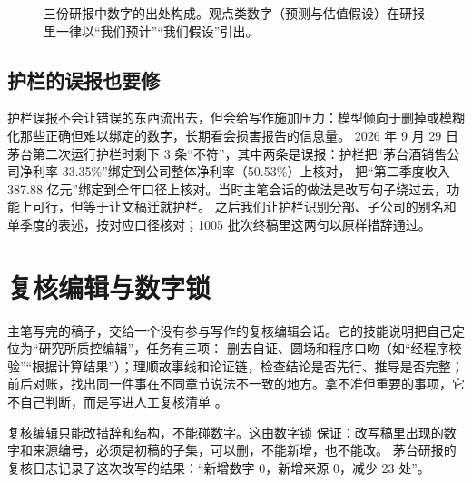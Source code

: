 \begin{figure}[htbp]
\centering
{}
\caption{三份研报中数字的出处构成。观点类数字（预测与估值假设）在研报里一律以“我们预计”“我们假设”引出。}
\label{fig:wr-prov}
\end{figure}

\subsection{护栏的误报也要修}

护栏误报不会让错误的东西流出去，但会给写作施加压力：模型倾向于删掉或模糊化那些正确但难以绑定的数字，长期看会损害报告的信息量。
2026 年 9 月 29 日茅台第二次运行护栏时剩下 3 条“不符”，其中两条是误报：护栏把“茅台酒销售公司净利率 33.35\%”绑定到公司整体净利率（50.53\%）上核对，
把“第二季度收入 387.88 亿元”绑定到全年口径上核对。当时主笔会话的做法是改写句子绕过去，功能上可行，但等于让文稿迁就护栏。
之后我们让护栏识别分部、子公司的别名和单季度的表述，按对应口径核对；1005 批次终稿里这两句以原样措辞通过。

\section{复核编辑与数字锁}

主笔写完的稿子，交给一个没有参与写作的复核编辑会话。它的技能说明把自己定位为“研究所质控编辑”，任务有三项：
删去自证、圆场和程序口吻（如“经程序校验”“根据计算结果”）；理顺故事线和论证链，检查结论是否先行、推导是否完整；
前后对账，找出同一件事在不同章节说法不一致的地方。拿不准但重要的事项，它不自己判断，而是写进人工复核清单 。

复核编辑只能改措辞和结构，不能碰数字。这由数字锁  保证：改写稿里出现的数字和来源编号，必须是初稿的子集，可以删，不能新增，也不能改。
茅台研报的复核日志记录了这次改写的结果：“新增数字 0，新增来源 0，减少 23 处”。

